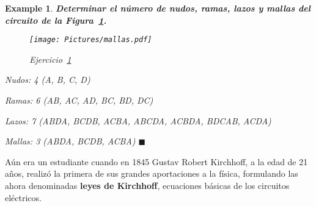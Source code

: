 \documentclass[11pt]{book} %
\numberwithin{dummy}{section}
\theoremstyle{ocrenumbox}
\theoremstyle{blacknumex}
\newtheorem{exampleT}{Example}[chapter]
\theoremstyle{blacknumbox}
\theoremstyle{ocrenum}
\newenvironment{example}{\begin{exampleT}}{\hfill{\tiny\ensuremath{\blacksquare}}\end{exampleT}}
\begin{document}
	\vspace{4mm}
	\begin{example}\label{ej.1-3}
		\textbf{Determinar el número de nudos, ramas, lazos y mallas del circuito de la Figura~\ref{fig.mallas}.}
		\begin{figure}[htbp]
			\centering
			\texttt{[image: Pictures/mallas.pdf]}
			\caption{Ejercicio~\ref{ej.1-3}}
			\label{fig.mallas}
		\end{figure}
		
		Nudos: 4 (A, B, C, D)
		
		Ramas: 6 (AB, AC, AD, BC, BD, DC)
		
		Lazos: 7 (ABDA, BCDB, ACBA, ABCDA, ACBDA, BDCAB, ACDA) 
		
		Mallas: 3 (ABDA, BCDB, ACBA)
	\end{example}
	
	
	Aún era un estudiante cuando en 1845 Gustav Robert Kirchhoff, a la edad de 21 años, realizó la primera de sus grandes aportaciones a la física, formulando las ahora denominadas \textbf{leyes de Kirchhoff}, ecuaciones básicas de los circuitos eléctricos.
	
\end{document}
